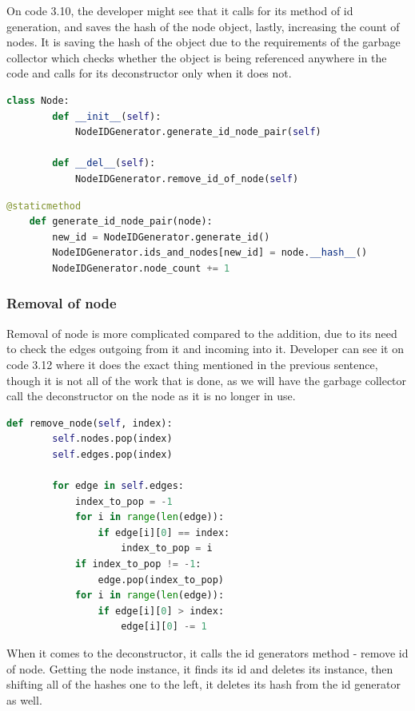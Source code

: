 On code 3.10, the developer might see that it calls for its method of id generation, and saves the hash of the node object, lastly, increasing the count of nodes. It is saving the hash of the object due to the requirements of the garbage collector which checks whether the object is being referenced anywhere in the code and calls for its deconstructor only when it does not.

\begin{lstlisting}[language={python}]
	class Node:
		def __init__(self):
			NodeIDGenerator.generate_id_node_pair(self)
		
		def __del__(self):
			NodeIDGenerator.remove_id_of_node(self)
\end{lstlisting}

\begin{lstlisting}[language={python}]
    @staticmethod
	def generate_id_node_pair(node):
		new_id = NodeIDGenerator.generate_id()
		NodeIDGenerator.ids_and_nodes[new_id] = node.__hash__()
		NodeIDGenerator.node_count += 1
\end{lstlisting}


\subsubsection{Removal of node}

Removal of node is more complicated compared to the addition, due to its need to check the edges outgoing from it and incoming into it. Developer can see it on code 3.12 where it does the exact thing mentioned in the previous sentence, though it is not all of the work that is done, as we will have the garbage collector call the deconstructor on the node as it is no longer in use.

\begin{lstlisting}[language={python}]
 	def remove_node(self, index):
		self.nodes.pop(index)
		self.edges.pop(index)
		
		for edge in self.edges:
			index_to_pop = -1
			for i in range(len(edge)):
				if edge[i][0] == index:
					index_to_pop = i
			if index_to_pop != -1:
				edge.pop(index_to_pop)
			for i in range(len(edge)):
				if edge[i][0] > index:
					edge[i][0] -= 1
\end{lstlisting}

When it comes to the deconstructor, it calls the id generators method - remove id of node. Getting the node instance, it finds its id and deletes its instance, then shifting all of the hashes one to the left, it deletes its hash from the id generator as well.

